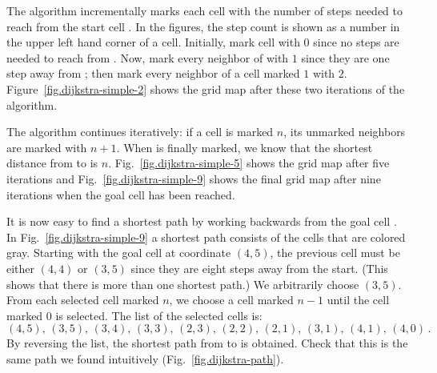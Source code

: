 The algorithm incrementally marks each cell  with the number of steps needed to reach  from the start cell . In the figures, the step count is shown as a number in the upper left hand corner of a cell. Initially, mark cell  with $0$ since no steps are needed to reach  from . Now, mark every neighbor of  with $1$ since they are one step away from ; then mark every neighbor of a cell marked $1$ with $2$. Figure~\ref{fig.dijkstra-simple-2} shows the grid map after these two iterations of the algorithm.

\begin{figure}
\subfigures
\begin{minipage}{\textwidth}
\hspace{\fill}
\end{minipage}
\end{figure}

The algorithm continues iteratively: if a cell is marked $n$, its unmarked neighbors are marked with $n+1$. When  is finally marked, we know that the shortest distance from  to  is $n$. Fig.~\ref{fig.dijkstra-simple-5} shows the grid map after five iterations and Fig.~\ref{fig.dijkstra-simple-9} shows the final grid map after nine iterations when the goal cell has been reached.

It is now easy to find a shortest path by working backwards from the goal cell . In Fig.~\ref{fig.dijkstra-simple-9} a shortest path consists of the cells that are colored gray. Starting with the goal cell at coordinate $(4,5)$, the previous cell must be either $(4,4)$ or $(3,5)$ since they are eight steps away from the start. (This shows that there is more than one shortest path.) We arbitrarily choose $(3,5)$. From each selected cell marked $n$, we choose a cell marked $n-1$ until the cell  marked $0$ is selected. The list of the selected cells is:
\[
(4,5),\, (3,5),\, (3,4),\, (3,3),\, (2,3),\, (2,2),\, (2,1),\, (3,1),\, (4,1),\, (4,0)\,.
\]
By reversing the list, the shortest path from  to  is obtained. Check that this is the same path we found intuitively (Fig.~\ref{fig.dijkstra-path}).

